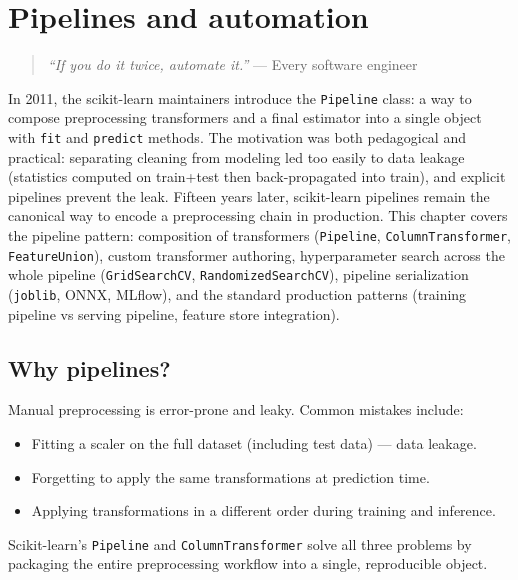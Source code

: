 \chapter{Pipelines and automation}
\label{ch:pipelines}

\begin{quote}
\emph{``If you do it twice, automate it.''}
--- Every software engineer
\end{quote}

In 2011, the scikit-learn maintainers introduce the \texttt{Pipeline} class: a way to compose preprocessing transformers and a final estimator into a single object with \texttt{fit} and \texttt{predict} methods. The motivation was both pedagogical and practical: separating cleaning from modeling led too easily to data leakage (statistics computed on train+test then back-propagated into train), and explicit pipelines prevent the leak. Fifteen years later, scikit-learn pipelines remain the canonical way to encode a preprocessing chain in production. This chapter covers the pipeline pattern: composition of transformers (\texttt{Pipeline}, \texttt{ColumnTransformer}, \texttt{FeatureUnion}), custom transformer authoring, hyperparameter search across the whole pipeline (\texttt{GridSearchCV}, \texttt{RandomizedSearchCV}), pipeline serialization (\texttt{joblib}, ONNX, MLflow), and the standard production patterns (training pipeline vs serving pipeline, feature store integration).

\section{Why pipelines?}

Manual preprocessing is error-prone and leaky. Common mistakes include:
\begin{itemize}
  \item Fitting a scaler on the full dataset (including test data) --- data leakage.
  \item Forgetting to apply the same transformations at prediction time.
  \item Applying transformations in a different order during training and inference.
\end{itemize}

Scikit-learn's \texttt{Pipeline} and \texttt{ColumnTransformer} solve all three problems by packaging the entire preprocessing workflow into a single, reproducible object.

